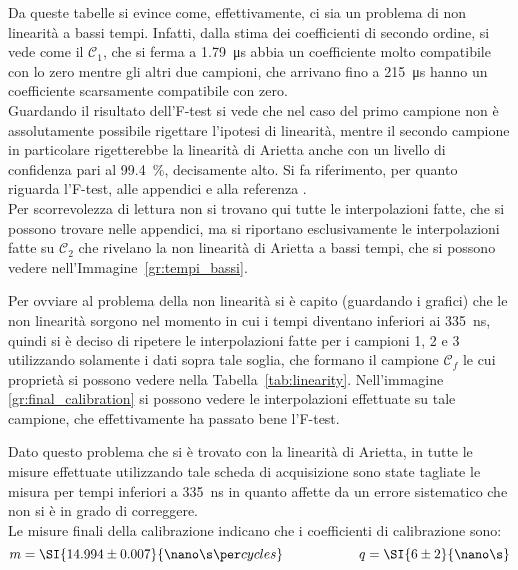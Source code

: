Da queste tabelle si evince come, effettivamente, ci sia un problema di non linearità a bassi tempi. 
Infatti, dalla stima dei coefficienti di secondo ordine, si vede come il $\mathcal{C}_1$, che si ferma a \SI{1.79}{\micro\s} abbia un coefficiente molto compatibile con lo zero mentre gli altri due campioni, che arrivano fino a \SI{215}{\micro\s} hanno un coefficiente scarsamente compatibile con zero.\\

Guardando il risultato dell'F-test si vede che nel caso del primo campione non è assolutamente possibile rigettare l'ipotesi di linearità, mentre il secondo campione in particolare rigetterebbe la linearità di Arietta anche con un livello di confidenza pari al \SI{99.4}{\percent}, decisamente alto. Si fa riferimento, per quanto riguarda l'F-test, alle appendici e alla referenza \cite{bib:F_test}.\\


Per scorrevolezza di lettura non si trovano qui tutte le interpolazioni fatte, che si possono trovare nelle appendici, ma si riportano esclusivamente le interpolazioni fatte su $\mathcal{C}_2$  che rivelano la non linearità di Arietta a bassi tempi, che si possono vedere nell'Immagine~\ref{gr:tempi_bassi}.\\

Per ovviare al problema della non linearità si è capito (guardando i grafici) che le non linearità sorgono nel momento in cui i tempi diventano inferiori ai \SI{335}{\ns}, quindi si è deciso di ripetere le interpolazioni fatte per i campioni 1, 2 e 3 utilizzando solamente i dati sopra tale soglia, che formano il campione $\mathcal{C}_f$ le cui proprietà si possono vedere nella Tabella~\ref{tab:linearity}. 
Nell'immagine \ref{gr:final_calibration} si possono vedere le interpolazioni effettuate su tale campione, che effettivamente ha passato bene l'F-test.\\

Dato questo problema che si è trovato con la linearità di Arietta, in tutte le misure effettuate utilizzando tale scheda di acquisizione sono state tagliate le misura per tempi inferiori a \SI{335}{\ns} in quanto affette da un errore sistematico che non si è in grado di correggere.\\

Le misure finali della calibrazione indicano che i coefficienti di calibrazione sono:
\begin{equation}
  m = \SI{14.994 \pm 0.007}{\nano\s\per cycles} \hspace{2cm} q = \SI{6 \pm 2}{\nano\s}
\end{equation}


